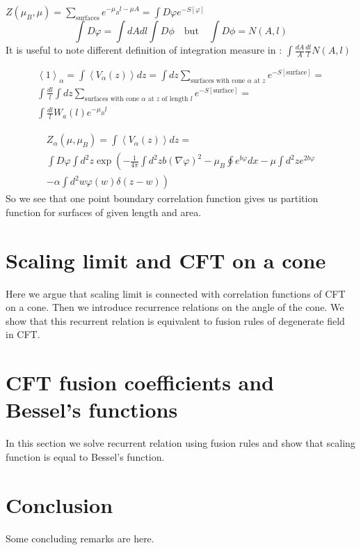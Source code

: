 \documentclass[12pt]{article}
\begin{document}
$Z(\mu_{B},\mu) = \sum_{\mbox{surfaces}} e^{-\mu_{B}l -\mu A}=\int D\varphi e^{-S[\varphi]}$
\begin{equation}
  \label{eq:28}
  \int D\varphi = \int dA dl \int D\phi \quad \mbox{but} \quad \int D\phi = N(A,l)
\end{equation}
It is useful to note different definition of integration measure in \cite{fateev2000boundary}: $\int
\frac{d A}{A}\frac{d l }{l} N(A,l)$

\begin{multline}
  \label{eq:30}
  \left< 1 \right>_{\alpha}=\int \left< V_{\alpha}(z)\right> dz = \int dz \sum_{\mbox{surfaces with cone
    }\alpha\mbox{ at }z} e^{-S[\mbox{surface}]}=\\
  \int \frac{dl}{l} \int dz  \sum_{\mbox{surfaces with cone
    }\alpha\mbox{ at }z \mbox{ of length }l}e^{-S[\mbox{surface}]}=\\
  \int\frac{dl}{l} W_{a}(l) e^{-\mu_{B}l}
\end{multline}


\begin{multline}
  \label{eq:31}
  Z_{\alpha}(\mu,\mu_{B}) = \int \left< V_{\alpha}(z)\right> dz=\\\int D\varphi\int d^{2}z \exp\left(-\frac{1}{4\pi} \int d^{2}z
    b(\nabla\varphi)^{2}-\mu_{B}\oint e^{b\varphi}dx -\mu\int d^{2}z e^{2b\varphi}\right.\\
  \left.-\alpha\int
  d^{2}w \varphi(w) \delta(z-w)\right)
\end{multline}
So we see that one point boundary correlation function gives us partition function for surfaces of
given length and area. 

\section{Scaling limit and CFT on a cone}
\label{sec:scaling-limit-cft}

Here we argue that scaling limit is connected with correlation
functions of CFT on a cone. Then we introduce recurrence relations on
the angle of the cone. We show that this recurrent relation is
equivalent to fusion rules of degenerate field in CFT. 


\section{CFT fusion coefficients and Bessel's functions}
\label{sec:cft-fusi-coeff}

In this section we solve recurrent relation using fusion rules and
show that scaling function is equal to Bessel's function. 

\section{Conclusion}
\label{sec:conclusion}
Some concluding remarks are here. 

{} 

\end{document}
